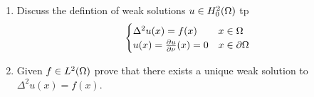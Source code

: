 \begin{enumerate}
\item Discuss the defintion of weak solutions $u \in H_0^2(\Omega)$ tp
  $$
  \begin{cases}
    \Delta^2 u(x) = f(x) & x \in \Omega\\
    u(x) = \frac{\partial u}{\partial \nu}(x) = 0 & x \in \partial \Omega
  \end{cases}
  $$

\item Given $f \in L^2(\Omega)$ prove that there exists a unique weak solution to $\Delta^2 u(x) = f(x)$.

\end{enumerate}
